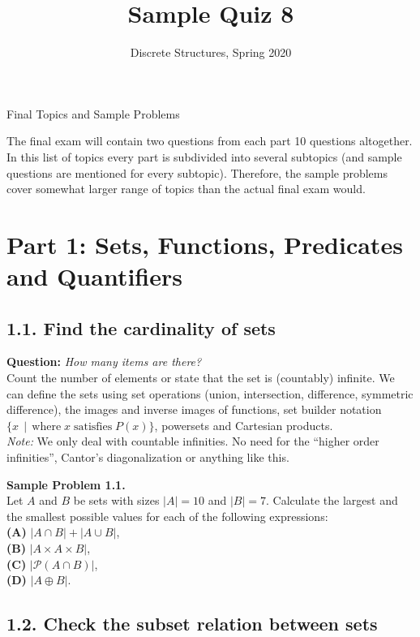 \documentclass[jou]{apa6}
\title{Sample Quiz 8}
\author{Discrete Structures, Spring 2020}
\affiliation{RBS}
\begin{document}
\thispagestyle{empty}

\twocolumn
{\Large Final Topics and Sample Problems}

The final exam will contain two questions from 
each part \textendash{} 10 questions altogether. 
In this list of topics every part is subdivided
into several subtopics (and sample questions 
are mentioned for every subtopic). 
Therefore, the sample problems cover somewhat
larger range of topics than the actual final exam would.

\section{Part 1: Sets, Functions, Predicates and Quantifiers}

\subsection{1.1. Find the cardinality of sets}

{\bf Question:} {\em How many items are there?}\\
{\scriptsize
Count the number of elements or state that the set is (countably) infinite. 
We can define the sets using set operations (union, intersection, difference, 
symmetric difference), the images and inverse images of functions, 
set builder notation $\{ x \,\mid\, \text{where}\;x\;\text{satisfies}\;P(x)\}$, 
powersets and Cartesian products.\\
{\em Note:} We only deal with countable infinities. 
No need for the ``higher order infinities'', 
Cantor’s diagonalization or anything like this.
}


\vspace{6pt}
{\bf Sample Problem 1.1.}\\
Let $A$ and $B$ be sets with sizes $|A| = 10$ and $|B| = 7$. Calculate 
the largest and the smallest possible values for each of the following expressions:\\
{\bf (A)} $|A \cap B| + |A \cup B|$,\\
{\bf (B)} $|A \times A \times B|$,\\
{\bf (C)} $\left| \mathcal{P}(A \cap B) \right|$,\\
{\bf (D)} $|A \oplus B|$.


\subsection{1.2. Check the subset relation between sets} 
\end{document}
